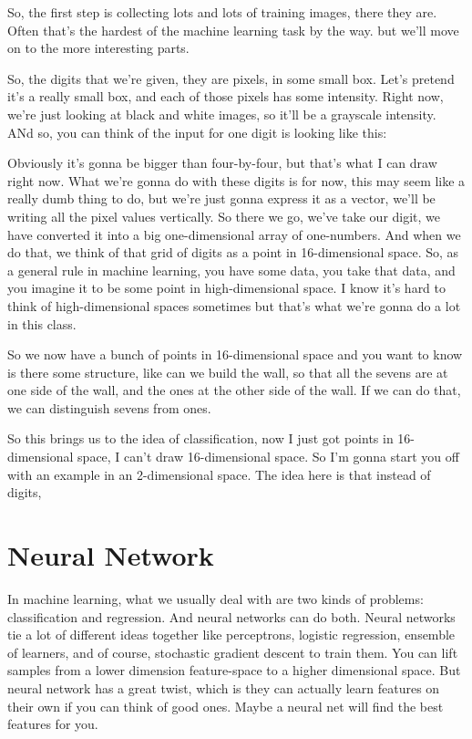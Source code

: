\documentclass[fleqn,10pt]{olplainarticle}
\theoremstyle{definition}
\theoremstyle{remark}
\begin{document}
So, the first step is collecting lots and lots of training images, there they are. Often that's the hardest of the machine learning task by the way. but we'll move on to the more interesting parts. 

So, the digits that we're given, they are pixels, in some small box. Let's pretend it's a really small box, and each of those pixels has some intensity. Right now, we're just looking at black and white images, so it'll be a grayscale intensity. ANd so, you can think of the input for one digit is looking like this:



Obviously it's gonna be bigger than four-by-four, but that's what I can draw right now. What we're gonna do with these digits is for now, this may seem like a really dumb thing to do, but we're just gonna express it as a vector, we'll be writing all the pixel values vertically. So there we go, we've take our digit, we have converted it into a big one-dimensional array of one-numbers. And when we do that, we think of that grid of digits as a point in 16-dimensional space. So, as a general rule in machine learning, you have some data, you take that data, and you imagine it to be some point in high-dimensional space. I know it's hard to think of high-dimensional spaces sometimes but that's what we're gonna do a lot in this class. 

So we now have a bunch of points in 16-dimensional space and you want to know is there some structure, like can we build the wall, so that all the sevens are at one side of the wall, and the ones at the other side of the wall. If we can do that, we can distinguish sevens from ones. 

So this brings us to the idea of classification, now I just got points in 16-dimensional space, I can't draw 16-dimensional space. So I'm gonna start you off with an example in an 2-dimensional space. The idea here is that instead of digits, 




















\clearpage
\section*{Neural Network}
In machine learning, what we usually deal with are two kinds of problems: classification and regression. And neural networks can do both. Neural networks tie a lot of different ideas together like perceptrons, logistic regression, ensemble of learners, and of course, stochastic gradient descent to train them. You can lift samples from a lower dimension feature-space to a higher dimensional space. But neural network has a great twist, which is they can actually learn features on their own if you can think of good ones. Maybe a neural net will find the best features for you. 
\end{document}
